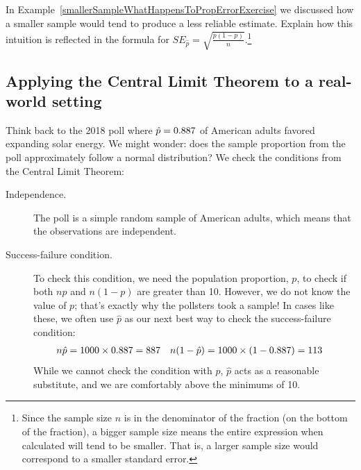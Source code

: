 \begin{exercise}
In Example~\ref{smallerSampleWhatHappensToPropErrorExercise}
we discussed how a smaller sample would tend
to produce a less reliable estimate. Explain how this intuition
is reflected in the formula for
$SE_{\hat{p}} = \sqrt{\frac{p (1 - p)}{n}}$.\footnote{Since the
sample size $n$ is in the denominator of the fraction (on the
bottom of the fraction), a bigger sample size means the entire
expression when calculated will tend to be smaller. That is,
a larger sample size would correspond to a smaller standard error.}
\end{exercise}



\subsection{Applying the Central Limit Theorem to a real-world setting}

Think back to the 2018 poll where
$\hat{p} = 0.887{}$ of American adults favored
expanding solar energy. We might wonder: does the sample
proportion from the poll approximately follow a normal
distribution?
We check the conditions from the Central Limit Theorem:
\begin{description}
\item[Independence.] The poll is a simple random sample of
    American adults, which means that the observations are
    independent.
\item[Success-failure condition.] To check this condition,
    we need the population proportion, $p$, to check if both
    $np$ and $n(1-p)$ are greater than 10. However, we do not
    know the value of $p$; that's exactly why the pollsters
    took a sample! In cases like these, we often use $\hat{p}$
    as our next best way to check the success-failure condition:
    \begin{align*}
    n\hat{p} &= 1000{} \times 0.887{}
        = 887{}
    &n (1 - \hat{p}) &= 1000{} \times (1 - 0.887{})
        = 113{}
    \end{align*}
    While we cannot check the condition with $p$,
    $\hat{p}$ acts as a reasonable substitute, and we are comfortably
    above the minimums of 10.
\end{description}

